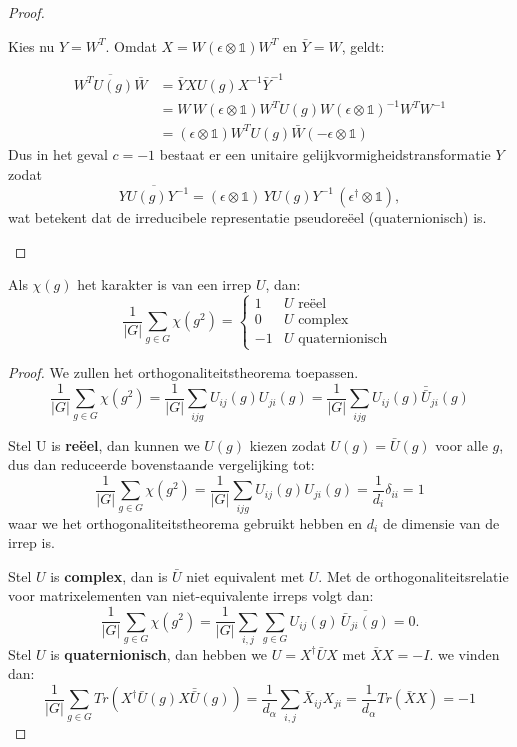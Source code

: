 \begin{proof}
\begin{itemize}
    Kies nu \(\boxed{Y = W^{T}}\). Omdat \(X = W(\epsilon\otimes\mathds{1})W^{T}\) en \(\bar{Y}=W\), geldt:

    \begin{align*}
        \overline{W^TU(g)\bar{W}}  
        &= \bar{Y}XU(g)X^{-1}\bar{Y}^{-1} \\
        &= W\,W(\epsilon\otimes\mathds{1})W^{T}U(g)W(\epsilon\otimes\mathds{1})^{-1}W^{T}W^{-1}\\
        &= (\epsilon\otimes\mathds{1})W^TU(g)\bar{W}(-\epsilon \otimes\mathds{1})
    \end{align*}
    Dus in het geval \(c=-1\) bestaat er een unitaire gelijkvormigheidstransformatie \(Y\) zodat
    \[\overline{YU(g)Y^{-1}} = (\epsilon\otimes\mathds{1})\,YU(g)Y^{-1}\,(\epsilon^{\dagger}\otimes\mathds{1}),\]
    wat betekent dat de irreducibele representatie pseudoreëel (quaternionisch) is.
\end{itemize}
\end{proof}

\begin{theorem}
    Als \(\chi (g)\) het karakter is van een irrep \(U\), dan:
\[\frac{1}{|G|} \sum_{g \in G} \chi(g^2) = \begin{cases}
    1 &  U \text{ reëel } \\
    0 &  U \text{ complex} \\
    -1 & U \text{ quaternionisch }
\end{cases}\]
\end{theorem}
\begin{proof}
    We zullen het orthogonaliteitstheorema toepassen.
    \[
        \frac{1}{|G|} \sum_{g \in G} \chi(g^2) = \frac{1}{|G|} \sum_{ijg}U_{ij}(g)U_{ji}(g) = \frac{1}{|G|} \sum_{ijg}U_{ij}(g)\bar{\bar{U}}_{ji}(g)
    \]

    Stel U is \textbf{reëel}, dan kunnen we \(U(g)\) kiezen zodat \(U(g) = \bar{U}(g)\) voor alle \(g\), dus dan reduceerde bovenstaande vergelijking tot:
    \[
        \frac{1}{|G|} \sum_{g \in G} \chi(g^2) =  \frac{1}{|G|} \sum_{ijg}U_{ij}(g){U}_{ji}(g) = \frac{1}{d_i} \delta_{ii} = 1
    \]
    waar we het orthogonaliteitstheorema gebruikt hebben en \(d_i\) de dimensie van de irrep is.

    Stel \(U\) is \textbf{complex}, dan is \(\bar{U}\) niet equivalent met \(U\). Met de orthogonaliteitsrelatie voor matrixelementen van niet-equivalente irreps volgt dan:
    \[
            \frac{1}{|G|} \sum_{g \in G} \chi(g^2)
            = \frac{1}{|G|} \sum_{i,j}\sum_{g\in G} U_{ij}(g)\,\overline{\bar{U}_{ji}(g)}
            = 0.
    \]
    Stel \(U\) is \textbf{quaternionisch}, dan hebben we \(U = X^\dagger \bar{U}X  \) met \(\bar{X}X = - I\). we vinden dan:
    \[
    \frac{1}{|G|} \sum_{g \in G} Tr(X^\dagger \bar{U}(g) X \bar{\bar{U}}(g)) = \frac{1}{d_\alpha} \sum_{i,j}\bar{X}_{ij}X_{ji} = \frac{1}{d_\alpha}  Tr(\bar{X}X) = -1
    \]
\end{proof}

